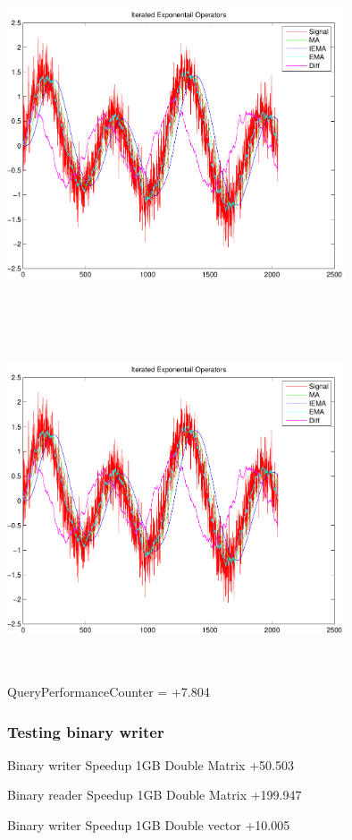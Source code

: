 \documentclass[9pt]{article}
\theoremstyle{plain}
\theoremstyle{definition}
\theoremstyle{remark}
\numberwithin{equation}{section}
\begin{document}
\includegraphics[width=10.0cm,height=10.0cm]{IteratedExponentailOperators.pdf}

\includegraphics[width=10.0cm,height=10.0cm]{IteratedExponentailOperators.pdf}

QueryPerformanceCounter  =  +7.804
\subsubsection{Testing binary writer}
Binary writer Speedup 1GB Double Matrix +50.503

Binary reader Speedup 1GB Double Matrix +199.947

Binary writer Speedup 1GB Double vector +10.005
\end{document}
